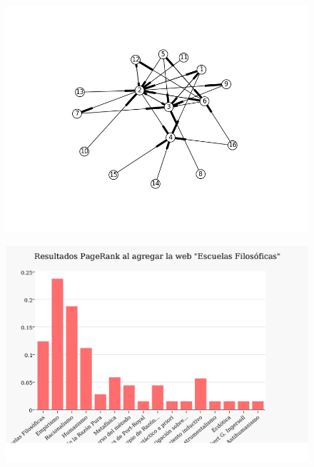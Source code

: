 \documentclass[a4paper]{article}
\begin{document}
\begin{figure}[h!]
  \begin{center}
	\includegraphics[scale=0.6]{imagenes/Exp2/grafo2}
	\caption{}
	\label{grafo2}
  \end{center}
\end{figure}
\newpage
\begin{figure}[h!]
 \begin{center}
	\includegraphics[scale=0.3]{imagenes/Exp2/PR2}
	\caption{}
	\label{hitsa2}
  \end{center}
\end{figure}
\newpage
\end{document}
